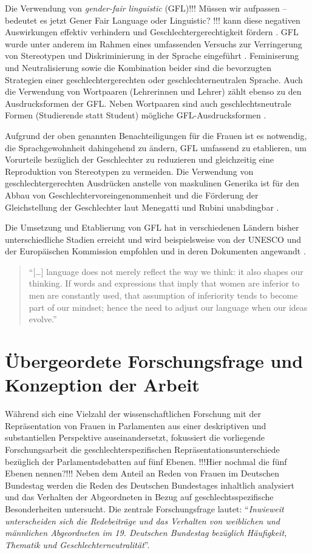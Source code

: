 \documentclass[12pt, 
    twoside=false, 
    bibliography=totoc, 
    numbers=endperiod, 
    headings=normal, 
    toc=chapterentrydotfill
    ]{scrbook}
\begin{document}
Die Verwendung von \emph{gender-fair linguistic} (GFL)!!! Müssen wir aufpassen -- bedeutet es jetzt Gener Fair Language oder Linguistic? !!! kann diese negativen Auswirkungen effektiv verhindern und Geschlechtergerechtigkeit fördern \parencite[1]{menegatti_2017}. GFL wurde unter anderem im Rahmen eines umfassenden Versuchs zur Verringerung von Stereotypen und Diskriminierung in der Sprache eingeführt \parencite[2]{sczesny_2016}. Feminiserung und Neutralisierung sowie die Kombination beider sind die bevorzugten Strategien einer geschlechtergerechten oder geschlechterneutralen Sprache. Auch die Verwendung von Wortpaaren (Lehrerinnen und Lehrer) zählt ebenso zu den Ausdrucksformen der GFL. Neben Wortpaaren sind auch geschlechtsneutrale Formen (Studierende statt Student) mögliche GFL-Ausdrucksformen \parencite[2]{sczesny_2016}.

Aufgrund der oben genannten Benachteiligungen für die Frauen ist es notwendig, die Sprachgewohnheit dahingehend zu ändern, GFL umfassend zu etablieren, um Vorurteile bezüglich der Geschlechter zu reduzieren und gleichzeitig eine Reproduktion von Stereotypen zu vermeiden. Die Verwendung von geschlechtergerechten Ausdrücken anstelle von maskulinen Generika ist für den Abbau von Geschlechtervoreingenommenheit und die Förderung der Gleichstellung der Geschlechter laut Menegatti und Rubini unabdingbar \parencite*{menegatti_2017}.

Die Umsetzung und Etablierung von GFL hat in verschiedenen Ländern bisher unterschiedliche Stadien erreicht und wird beispielsweise von der UNESCO und der Europäischen Kommission empfohlen und in deren Dokumenten angewandt \parencite[4]{sczesny_2016}.

\begin{quote}
    \enquote{[…] language does not merely reflect the way we think: it also shapes our thinking. If words and expressions that imply that women are inferior to men are constantly used, that assumption of inferiority tends to become part of our mindset; hence the need to adjust our language when our ideas evolve.} \parencite {unesco_2011} 
\end{quote}

\chapter{Übergeordete Forschungsfrage und Konzeption der Arbeit}

Während sich eine Vielzahl der wissenschaftlichen Forschung mit der Repräsentation von Frauen in Parlamenten aus einer deskriptiven und substantiellen Perspektive auseinandersetzt, fokussiert die vorliegende Forschungsarbeit die geschlechterspezifischen Repräsentationsunterschiede bezüglich der Parlamentsdebatten auf fünf Ebenen. !!!Hier nochmal die fünf Ebenen nennen?!!!
Neben dem Anteil an Reden von Frauen im Deutschen Bundestag werden die Reden des Deutschen Bundestages inhaltlich analysiert und das Verhalten der Abgeordneten in Bezug auf geschlechtsspezifische Besonderheiten untersucht. Die zentrale Forschungsfrage lautet: \enquote{\emph{Inwieweit unterscheiden sich die Redebeiträge und das Verhalten von weiblichen und männlichen Abgeordneten im 19. Deutschen Bundestag bezüglich Häufigkeit, Thematik und Geschlechterneutralität}}.
\end{document}

